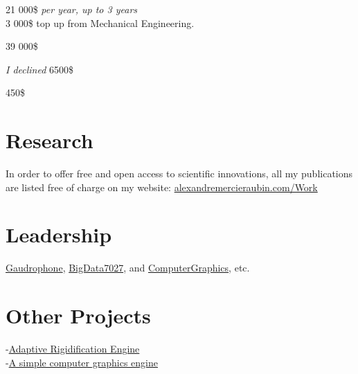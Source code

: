 \documentclass[10pt]{article} %
\begin{document}
{
 21 000\$ \textit{per year, up to 3 years} \\
 3 000\$ top up from Mechanical Engineering.\\
}

{
\textit{} 39 000\$\\
}

{
\textit{I declined} 6500\$\\
}

{
\textit{} 450\$\\
}

\section{Research}
In order to offer free and open access to scientific innovations, all my publications are listed free of charge on my website: \href{https://alexandremercieraubin.com/Work}{alexandremercieraubin.com/Work}


\section{Leadership}
{
\href{https://github.com/AlexandreMercierAubin/Gaudrophone}{Gaudrophone}, \href{https://github.com/AlexandreMercierAubin/BigData7027}{BigData7027}, and \href{https://github.com/AlexandreMercierAubin/ComputerGraphics}{ComputerGraphics}, etc. 
}
{}

\section{Other Projects}

{
-\href{https://github.com/AlexandreMercierAubin/AdaptiveRigidification2022}{Adaptive Rigidification Engine}\\
-\href{https://github.com/AlexandreMercierAubin/ComputerGraphics}{A simple computer graphics engine}\\

}
\end{document}
